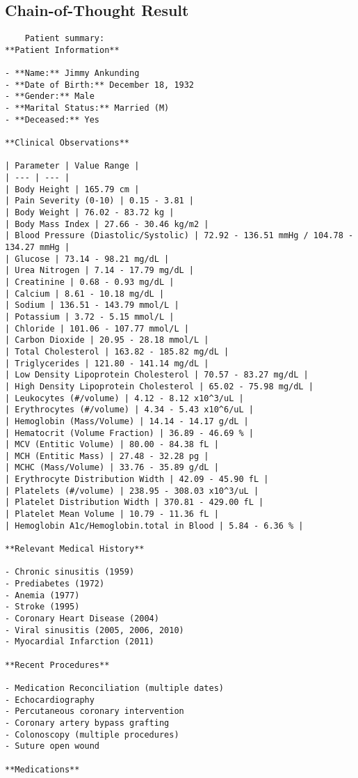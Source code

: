 \subsection{Chain-of-Thought Result}
\begin{lstlisting}
    Patient summary:
**Patient Information**

- **Name:** Jimmy Ankunding
- **Date of Birth:** December 18, 1932
- **Gender:** Male
- **Marital Status:** Married (M)
- **Deceased:** Yes

**Clinical Observations**

| Parameter | Value Range |
| --- | --- |
| Body Height | 165.79 cm |
| Pain Severity (0-10) | 0.15 - 3.81 |
| Body Weight | 76.02 - 83.72 kg |
| Body Mass Index | 27.66 - 30.46 kg/m2 |
| Blood Pressure (Diastolic/Systolic) | 72.92 - 136.51 mmHg / 104.78 - 134.27 mmHg |
| Glucose | 73.14 - 98.21 mg/dL |
| Urea Nitrogen | 7.14 - 17.79 mg/dL |
| Creatinine | 0.68 - 0.93 mg/dL |
| Calcium | 8.61 - 10.18 mg/dL |
| Sodium | 136.51 - 143.79 mmol/L |
| Potassium | 3.72 - 5.15 mmol/L |
| Chloride | 101.06 - 107.77 mmol/L |
| Carbon Dioxide | 20.95 - 28.18 mmol/L |
| Total Cholesterol | 163.82 - 185.82 mg/dL |
| Triglycerides | 121.80 - 141.14 mg/dL |
| Low Density Lipoprotein Cholesterol | 70.57 - 83.27 mg/dL |
| High Density Lipoprotein Cholesterol | 65.02 - 75.98 mg/dL |
| Leukocytes (#/volume) | 4.12 - 8.12 x10^3/uL |
| Erythrocytes (#/volume) | 4.34 - 5.43 x10^6/uL |
| Hemoglobin (Mass/Volume) | 14.14 - 14.17 g/dL |
| Hematocrit (Volume Fraction) | 36.89 - 46.69 % |
| MCV (Entitic Volume) | 80.00 - 84.38 fL |
| MCH (Entitic Mass) | 27.48 - 32.28 pg |
| MCHC (Mass/Volume) | 33.76 - 35.89 g/dL |
| Erythrocyte Distribution Width | 42.09 - 45.90 fL |
| Platelets (#/volume) | 238.95 - 308.03 x10^3/uL |
| Platelet Distribution Width | 370.81 - 429.00 fL |
| Platelet Mean Volume | 10.79 - 11.36 fL |
| Hemoglobin A1c/Hemoglobin.total in Blood | 5.84 - 6.36 % |

**Relevant Medical History**

- Chronic sinusitis (1959)
- Prediabetes (1972)
- Anemia (1977)
- Stroke (1995)
- Coronary Heart Disease (2004)
- Viral sinusitis (2005, 2006, 2010)
- Myocardial Infarction (2011)

**Recent Procedures**

- Medication Reconciliation (multiple dates)
- Echocardiography
- Percutaneous coronary intervention
- Coronary artery bypass grafting
- Colonoscopy (multiple procedures)
- Suture open wound

**Medications**


\end{lstlisting}
